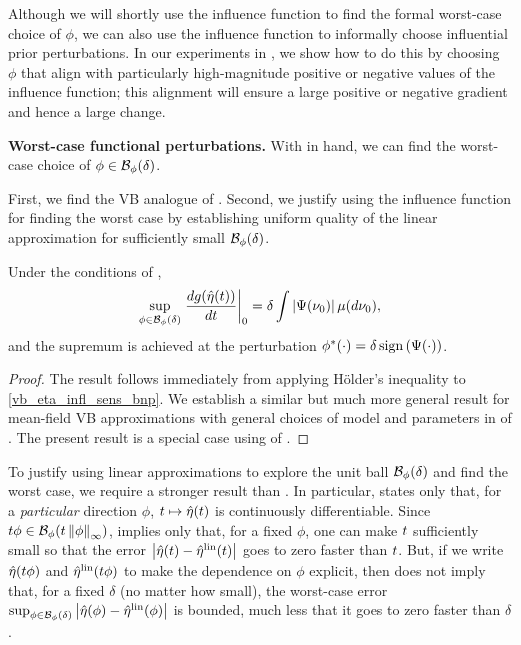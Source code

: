 Although we will shortly use the influence function to find the formal
worst-case choice of $\phi$, we can also use the influence function to
informally choose influential prior perturbations. In our experiments in
, we show how to do this by choosing $\phi$ that align with
particularly high-magnitude positive or negative values of the influence
function; this alignment will ensure a large positive or negative gradient and
hence a large change.

\noindent \textbf{Worst-case functional perturbations.}
%
With  in hand, we can find the worst-case
choice of $\phi \in \mathcal{B}_\phi(\delta)$.

\LinfExamplesFig{}

First, we find the VB analogue of \citet[Result 11]{gustafson:1996:local}.
Second, we justify using the influence function for finding the worst case by
establishing uniform quality of the linear approximation for sufficiently small
$\mathcal{B}_\phi(\delta)$.

\begin{cor}
%
Under the conditions of ,
%
\begin{align*}
%
\sup_{\phi \in \ball_\phi(\delta)}
    \fracat{d g(\etaopt(\t))}{d \t}{0} =
        \delta \int \abs{\infl(\nu_0)} \mu(d\nu_0),
%
\end{align*}
%
and the supremum is achieved at the perturbation
$\phi^*(\cdot) = \delta \, \mathrm{sign}\left(\Psi(\cdot)\right)$.
%
\end{cor}
%
\begin{proof}
%
The result follows immediately from applying H{\"o}lder's inequality to
\eqref{vb_eta_infl_sens_bnp}. We establish a similar but much more general
result for mean-field VB approximations with general choices of model and
parameters in  of . The
present result is a special case using  of
.
%
\end{proof}

To justify using linear approximations to explore the unit ball
$\mathcal{B}_\phi(\delta)$ and find the worst case, we require a stronger result than
. In particular,  states
only that, for a {\em particular} direction $\phi$, $t \mapsto \hat\eta(t)$ is
continuously differentiable.  Since $t \phi \in \mathcal{B}_\phi(t \left\Vert\phi\right\Vert_{\infty})$,
 implies only that, for a fixed $\phi$, one can make
$t$ sufficiently small so that the error $\left|\hat\eta(t) - \hat\eta^{\mathrm{lin}}(t)\right|$ goes
to zero faster than $t$. But, if we write $\hat\eta(t\phi)$ and $\hat\eta^{\mathrm{lin}}(t
\phi)$ to make the dependence on $\phi$ explicit, then
 does not imply that, for a fixed $\delta$ (no matter
how small), the worst-case error $\sup_{\phi \in \mathcal{B}_\phi(\delta)}
\left|\hat\eta(\phi) - \hat\eta^{\mathrm{lin}}(\phi)\right|$ is bounded, much less that it goes to zero
faster than $\delta$.

